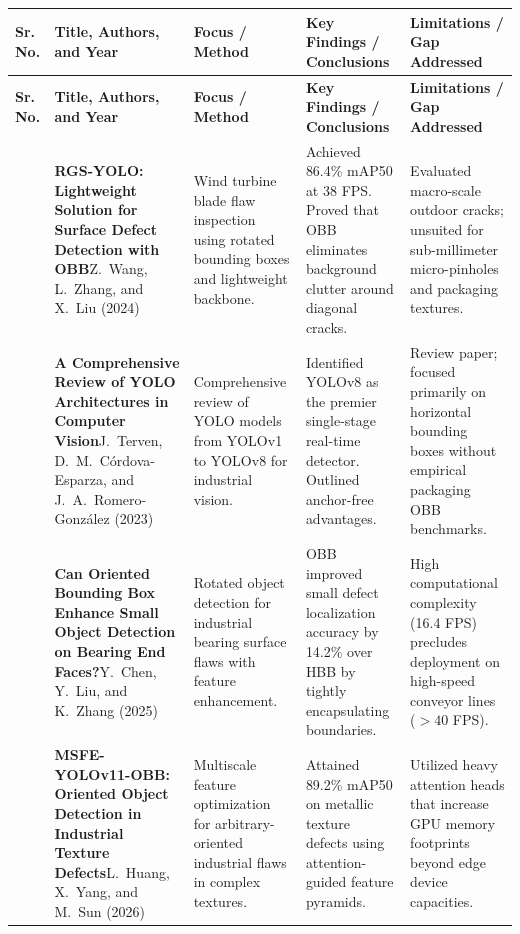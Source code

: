 \begingroup
\footnotesize\singlespacing
\setlength{\tabcolsep}{3pt}
\renewcommand{\arraystretch}{1.2}
\begin{longtable}{|>{\raggedright\arraybackslash}p{0.6cm}|>{\raggedright\arraybackslash}p{3.5cm}|>{\raggedright\arraybackslash}p{2.7cm}|>{\raggedright\arraybackslash}p{4.0cm}|>{\raggedright\arraybackslash}p{3.2cm}|}
\hline
\textbf{Sr. No.} & \textbf{Title, Authors, and Year} & \textbf{Focus / Method} & \textbf{Key Findings / Conclusions} & \textbf{Limitations / Gap Addressed}\\ \hline
\endfirsthead
\hline
\textbf{Sr. No.} & \textbf{Title, Authors, and Year} & \textbf{Focus / Method} & \textbf{Key Findings / Conclusions} & \textbf{Limitations / Gap Addressed}\\ \hline
\endhead
\hline
\endfoot
1 & \textbf{RGS-YOLO: Lightweight Solution for Surface Defect Detection with OBB}\newline Z.~Wang, L.~Zhang, and X.~Liu (2024)~\cite{wang2024rgs} & Wind turbine blade flaw inspection using rotated bounding boxes and lightweight backbone. & Achieved 86.4\% mAP50 at 38 FPS. Proved that OBB eliminates background clutter around diagonal cracks. & Evaluated macro-scale outdoor cracks; unsuited for sub-millimeter micro-pinholes and packaging textures.\\ \hline
2 & \textbf{A Comprehensive Review of YOLO Architectures in Computer Vision}\newline J.~Terven, D.~M.~C{\'o}rdova-Esparza, and J.~A.~Romero-Gonz{\'a}lez (2023)~\cite{terven2023yolo} & Comprehensive review of YOLO models from YOLOv1 to YOLOv8 for industrial vision. & Identified YOLOv8 as the premier single-stage real-time detector. Outlined anchor-free advantages. & Review paper; focused primarily on horizontal bounding boxes without empirical packaging OBB benchmarks.\\ \hline
3 & \textbf{Can Oriented Bounding Box Enhance Small Object Detection on Bearing End Faces?}\newline Y.~Chen, Y.~Liu, and K.~Zhang (2025)~\cite{chen2025obb} & Rotated object detection for industrial bearing surface flaws with feature enhancement. & OBB improved small defect localization accuracy by 14.2\% over HBB by tightly encapsulating boundaries. & High computational complexity (16.4 FPS) precludes deployment on high-speed conveyor lines ($>40$ FPS).\\ \hline
4 & \textbf{MSFE-YOLOv11-OBB: Oriented Object Detection in Industrial Texture Defects}\newline L.~Huang, X.~Yang, and M.~Sun (2026)~\cite{huang2026msfe} & Multiscale feature optimization for arbitrary-oriented industrial flaws in complex textures. & Attained 89.2\% mAP50 on metallic texture defects using attention-guided feature pyramids. & Utilized heavy attention heads that increase GPU memory footprints beyond edge device capacities.\\ \hline

\end{longtable}
